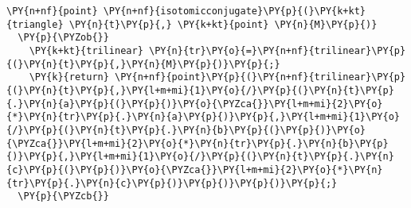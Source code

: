 \begin{Verbatim}[commandchars=\\\{\}]
  \PY{n+nf}{point} \PY{n+nf}{isotomicconjugate}\PY{p}{(}\PY{k+kt}{triangle} \PY{n}{t}\PY{p}{,} \PY{k+kt}{point} \PY{n}{M}\PY{p}{)}
  \PY{p}{\PYZob{}}
    \PY{k+kt}{trilinear} \PY{n}{tr}\PY{o}{=}\PY{n+nf}{trilinear}\PY{p}{(}\PY{n}{t}\PY{p}{,}\PY{n}{M}\PY{p}{)}\PY{p}{;}
    \PY{k}{return} \PY{n+nf}{point}\PY{p}{(}\PY{n+nf}{trilinear}\PY{p}{(}\PY{n}{t}\PY{p}{,}\PY{l+m+mi}{1}\PY{o}{/}\PY{p}{(}\PY{n}{t}\PY{p}{.}\PY{n}{a}\PY{p}{(}\PY{p}{)}\PY{o}{\PYZca{}}\PY{l+m+mi}{2}\PY{o}{*}\PY{n}{tr}\PY{p}{.}\PY{n}{a}\PY{p}{)}\PY{p}{,}\PY{l+m+mi}{1}\PY{o}{/}\PY{p}{(}\PY{n}{t}\PY{p}{.}\PY{n}{b}\PY{p}{(}\PY{p}{)}\PY{o}{\PYZca{}}\PY{l+m+mi}{2}\PY{o}{*}\PY{n}{tr}\PY{p}{.}\PY{n}{b}\PY{p}{)}\PY{p}{,}\PY{l+m+mi}{1}\PY{o}{/}\PY{p}{(}\PY{n}{t}\PY{p}{.}\PY{n}{c}\PY{p}{(}\PY{p}{)}\PY{o}{\PYZca{}}\PY{l+m+mi}{2}\PY{o}{*}\PY{n}{tr}\PY{p}{.}\PY{n}{c}\PY{p}{)}\PY{p}{)}\PY{p}{)}\PY{p}{;}
  \PY{p}{\PYZcb{}}
\end{Verbatim}
